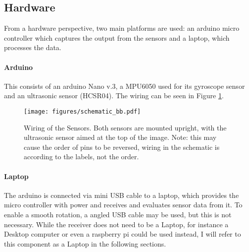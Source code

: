 \subsection{Hardware}
\label{subsec:hardware}

From a hardware perspective, two main platforms are used: an arduino micro controller which captures the output from the sensors and a laptop, which processes the data.

\paragraph{Arduino}
This consists of an arduino Nano v.3, a MPU6050 used for its gyroscope sensor and an ultrasonic sensor (HCSR04). The wiring can be seen in Figure \ref{fig:schematic}.

\begin{figure}
    \centering
    \texttt{[image: figures/schematic\_bb.pdf]}
    \caption{Wiring of the Sensors. Both sensors are mounted upright, with the ultrasonic sensor aimed at the top of the image. Note: this may cause the order of pins to be reversed, wiring in the schematic is according to the labels, not the order.}
    \label{fig:schematic}
\end{figure}


\paragraph{Laptop}
The arduino is connected via mini USB cable to a laptop, which provides the micro controller with power and receives and evaluates sensor data from it.
To enable a smooth rotation, a angled USB cable may be used, but this is not necessary.
While the receiver does not need to be a Laptop, for instance a Desktop computer or even a raspberry pi could be used instead, I will refer to this component as a Laptop in the following sections.